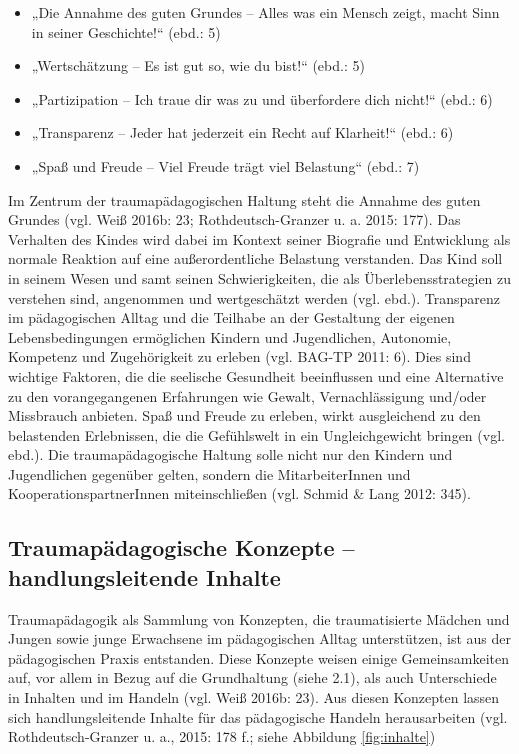\begin{itemize}
\item „Die Annahme des guten Grundes – Alles was ein Mensch zeigt, macht Sinn in seiner Geschichte!“ (ebd.: 5) 
\item „Wertsch{\"a}tzung – Es ist gut so, wie du bist!“ (ebd.: 5) 
\item „Partizipation – Ich traue dir was zu und {\"u}berfordere dich nicht!“ (ebd.: 6) 
\item „Transparenz – Jeder hat jederzeit ein Recht auf Klarheit!“ (ebd.: 6) 
\item „Spaß und Freude – Viel Freude tr{\"a}gt viel Belastung“ (ebd.: 7)
\end{itemize}

Im Zentrum der traumapädagogischen Haltung steht die Annahme des guten Grundes (vgl. Weiß 2016b: 23; Rothdeutsch-Granzer u. a. 2015: 177). Das Verhalten des Kindes wird dabei im Kontext seiner Biografie und Entwicklung als normale Reaktion auf eine außerordentliche Belastung verstanden. Das Kind soll in seinem Wesen und samt seinen Schwierigkeiten, die als Überlebensstrategien zu verstehen sind, angenommen und wertgeschätzt werden (vgl. ebd.). Transparenz im pädagogischen Alltag und die Teilhabe an der Gestaltung der eigenen Lebensbedingungen ermöglichen Kindern und Jugendlichen, Autonomie, Kompetenz und Zugeh{\"o}rigkeit zu erleben (vgl. BAG-TP 2011: 6). Dies sind wichtige Faktoren, die die seelische Gesundheit beeinflussen und eine Alternative zu den vorangegangenen Erfahrungen wie Gewalt, Vernachl{\"a}ssigung und/oder Missbrauch anbieten. Spaß und Freude zu erleben, wirkt ausgleichend zu den belastenden Erlebnissen, die die Gefühlswelt in ein Ungleichgewicht bringen (vgl. ebd.). Die traumapädagogische Haltung solle nicht nur den Kindern und Jugendlichen gegenüber gelten, sondern die MitarbeiterInnen und KooperationspartnerInnen miteinschließen (vgl. Schmid \& Lang 2012: 345).

\subsection{Traumapädagogische Konzepte – handlungsleitende Inhalte}
Traumapädagogik als Sammlung von Konzepten, die traumatisierte Mädchen und Jungen sowie junge Erwachsene im pädagogischen Alltag unterstützen, ist aus der pädagogischen Praxis entstanden. Diese Konzepte weisen einige Gemeinsamkeiten auf, vor allem in Bezug auf die Grundhaltung (siehe 2.1), als auch Unterschiede in Inhalten und im Handeln (vgl. Weiß 2016b: 23). Aus diesen Konzepten lassen sich handlungsleitende Inhalte für das pädagogische Handeln herausarbeiten (vgl. Rothdeutsch-Granzer u. a., 2015: 178 f.; siehe Abbildung \ref{fig:inhalte})


